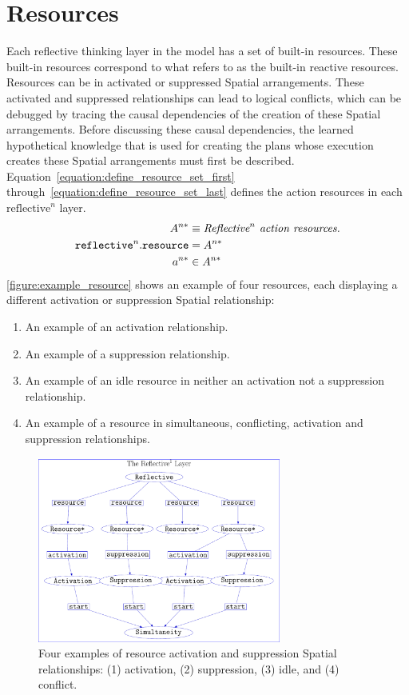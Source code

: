 \section{Resources}

Each reflective thinking layer in the model has a set of built-in
resources.  These built-in resources correspond to what
\cite{minsky:2006} refers to as the built-in reactive resources.
Resources can be in activated or suppressed Spatial arrangements.
These activated and suppressed relationships can lead to logical
conflicts, which can be debugged by tracing the causal dependencies of
the creation of these Spatial arrangements.  Before discussing these
causal dependencies, the learned hypothetical knowledge that is used
for creating the plans whose execution creates these Spatial
arrangements must first be described.
{\mbox{Equation~\ref{equation:define_resource_set_first}}}
{\mbox{through~\ref{equation:define_resource_set_last}}} defines the
action resources in each $\text{reflective}^n$ layer.
\begin{align}
\label{equation:define_resource_set_first}
                                       A^{n*} &\equiv \text{\emph{$\text{Reflective}^n$ action resources.}} \\
\text{\tt{reflective}}^n.\text{\tt{resource}} &= A^{n*} \\
\label{equation:define_resource_set_last}
                                       a^{n*} &\in A^{n*}
\end{align}
{\mbox{\autoref{figure:example_resource}}} shows an example of four resources, each displaying a different activation or suppression Spatial relationship:
\begin{enumerate}
\item An example of an activation relationship.
\item An example of a suppression relationship.
\item An example of an idle resource in neither an activation not a
  suppression relationship.
\item An example of a resource in simultaneous, conflicting,
  activation and suppression relationships.
\end{enumerate}
\begin{figure}
\center
\includegraphics[width=8cm]{gfx/example_resource_conflict}
\caption[Four examples of resource activation and suppression Spatial
  relationships.]{Four examples of resource activation and suppression
  Spatial relationships: (1) activation, (2) suppression, (3) idle,
  and (4) conflict.}
\label{figure:example_resource_conflict}
\end{figure}


